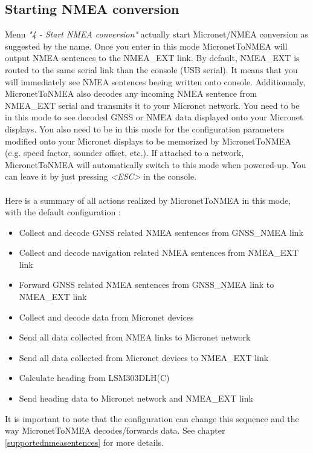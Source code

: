 \documentclass{report}
\begin{document}
\subsection{Starting NMEA conversion}

Menu \emph{"4 - Start NMEA conversion"} actually start Micronet/NMEA conversion as suggested by the name. Once you enter in this mode MicronetToNMEA will output NMEA sentences to the NMEA\_EXT link. By default, NMEA\_EXT is routed to the same serial link than the console (USB serial). It means that you will immediately see NMEA sentences beeing written onto console. Additionnaly, MicronetToNMEA also decodes any incoming NMEA sentence from NMEA\_EXT serial and transmits it to your Micronet network.
You need to be in this mode to see decoded GNSS or NMEA data displayed onto your Micronet displays. You also need to be in this mode for the configuration parameters modified onto your Micronet displays to be memorized by MicronetToNMEA (e.g. speed factor, sounder offset, etc.).
If attached to a network, MicronetToNMEA will automatically switch to this mode when powered-up. You can leave it by just pressing \emph{<ESC>} in the console.
\\
\\
Here is a summary of all actions realized by MicronetToNMEA in this mode, with the default configuration :
\begin{itemize}
	\item Collect and decode GNSS related NMEA sentences from GNSS\_NMEA link
	\item Collect and decode navigation related NMEA sentences from NMEA\_EXT link
	\item Forward GNSS related NMEA sentences from GNSS\_NMEA link to NMEA\_EXT link
	\item Collect and decode data from Micronet devices
	\item Send all data collected from NMEA links to Micronet network
	\item Send all data collected from Micronet devices to NMEA\_EXT link
	\item Calculate heading from LSM303DLH(C)
	\item Send heading data to Micronet network and NMEA\_EXT link
\end{itemize}

It is important to note that the configuration can change this sequence and the way MicronetToNMEA decodes/forwards data. See chapter {\ref{supportednmeasentences}} for more details.
\end{document}
